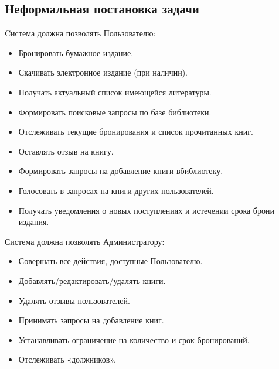 \documentclass[./intro.tex]{subfiles}
\begin{document}
\subsection{Неформальная постановка задачи}
\par
Cистема должна позволять Пользователю:
\begin{itemize}
    \item Бронировать бумажное издание.
    \item Скачивать электронное издание (при наличии).
    \item Получать актуальный список имеющейся литературы.
    \item Формировать поисковые запросы по базе библиотеки.
    \item Отслеживать текущие бронирования и список прочитанных книг.
    \item Оставлять отзыв на книгу.
    \item Формировать запросы на добавление книги вбиблиотеку.
    \item Голосовать в запросах на книги других пользователей.
    \item Получать уведомления о новых поступлениях и истечении срока брони издания.
\end{itemize}
\par
Система должна позволять Администратору:
\begin{itemize}
    \item Совершать все действия, доступные Пользователю.
    \item Добавлять/редактировать/удалять книги.
    \item Удалять отзывы пользователей.
    \item Принимать запросы на добавление книг.
    \item Устанавливать ограничение на количество и срок бронирований.
    \item Отслеживать «должников».
\end{itemize}
\end{document}
